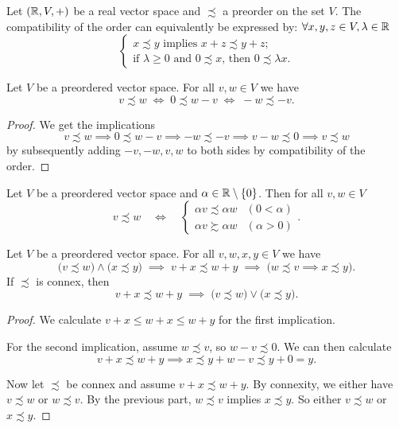 \begin{lemma} \label{positiveConeOrderCharacterisation}
Let $\left( \mathbb{R}, V, + \right)$ be a real vector space and $\precsim$ a preorder on the set $V$. The compatibility of the order can equivalently be expressed by:
$\forall x,y,z\in V, \lambda\in\mathbb{R}$
\[ \begin{cases}
\text{$x \precsim y$ implies $x+z \precsim y+z$;} \\
\text{if $\lambda\geq 0$ and $0 \precsim x$, then $0 \precsim \lambda x$.}
\end{cases} \]
\end{lemma}

\begin{lemma} \label{elementaryVectorPreorderManipulations}
Let $V$ be a preordered vector space. For all $v,w \in V$ we have
\[ v \precsim w \;\iff\; 0 \precsim  w - v \;\iff\; -w \precsim -v.  \]
\end{lemma}
\begin{proof}
We get the implications
\[ v \precsim w \implies 0 \precsim  w - v \implies -w \precsim -v \implies v-w \precsim 0 \implies v\precsim w \]
by subsequently adding $-v, -w, v,w$ to both sides by compatibility of the order.
\end{proof}
\begin{corollary}
Let $V$ be a preordered vector space and $\alpha \in \mathbb{R}\setminus\{0\}$. Then for all $v,w\in V$
\[ v \precsim w \quad \iff \quad \begin{cases}
\alpha v \precsim \alpha w & (0 < \alpha) \\
\alpha v \succsim \alpha w & (\alpha > 0)
\end{cases}. \] 
\end{corollary}

\begin{lemma} \label{additionVectorInequalities}
Let $V$ be a preordered vector space. For all $v,w, x, y \in V$ we have
\[ \big(v \precsim w\big) \land \big(x \precsim y\big) \;\implies\; v+ x \precsim w+y \;\implies\; \Big( w \precsim v \implies x\precsim y\Big). \]
If $\precsim$ is connex, then
\[ v+ x \precsim w+y \;\implies\; \big(v\precsim w\big)\lor\big( x\precsim y\big). \]
\end{lemma}
\begin{proof}
We calculate $v + x \leq w + x \leq w+y$ for the first implication.

For the second implication, assume $w\precsim v$, so $w-v \precsim 0$. We can then calculate
\[ v+ x \precsim w+y \implies x\precsim y + w - v \precsim y + 0 = y. \]

Now let $\precsim$ be connex and assume $v+ x \precsim w+y$. By connexity, we either have $v\precsim w$ or $w\precsim v$. By the previous part, $w\precsim v$ implies $x\precsim y$. So either $v\precsim w$ or $x\precsim y$.
\end{proof}

